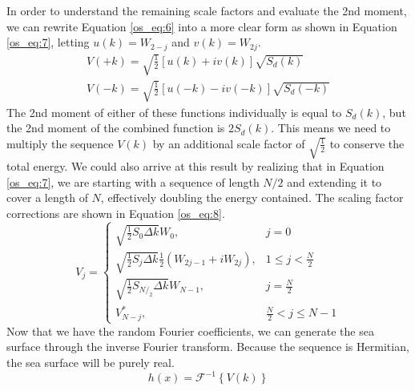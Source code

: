 In order to understand the remaining scale factors and evaluate the 2nd moment, we can rewrite Equation \ref{os_eq:6} into a more clear form as shown in Equation \ref{os_eq:7}, letting $u(k) = W_{2-j}$ and $v(k) = W_{2j}$.
\begin{equation}
  \begin{gathered}
  \label{os_eq:7}
  V(+k) = \sqrt{\frac{1}{2}}\left[u(k) + iv(k) \right]\sqrt{S_d(k)} \\
  V(-k) = \sqrt{\frac{1}{2}}\left[u(-k) - iv(-k) \right]\sqrt{S_d(-k)}
  \end{gathered}
\end{equation}
The 2nd moment of either of these functions individually is equal to $S_d(k)$, but the 2nd moment of the combined function is $2S_d(k)$. This means we need to multiply the sequence $V(k)$ by an additional scale factor of $\sqrt{\frac{1}{2}}$ to conserve the total energy. We could also arrive at this result by realizing that in Equation \ref{os_eq:7}, we are starting with a sequence of length $N/2$ and extending it to cover a length of $N$, effectively doubling the energy contained. The scaling factor corrections are shown in Equation \ref{os_eq:8}.
\begin{equation}
  \label{os_eq:8}   
  V_j = \begin{cases}
    \sqrt{\frac{1}{2}S_0\Delta k}W_0, & j = 0 \\
    \sqrt{\frac{1}{2}S_j\Delta k}\frac{1}{2}\left(W_{2j-1} + iW_{2j} \right), & 1 \leq j < \frac{N}{2} \\
    \sqrt{\frac{1}{2}S_{N/_2}\Delta k}W_{N-1}, & j = \frac{N}{2} \\
    V_{N-j}^*, &  \frac{N}{2} < j \leq N-1 
  \end{cases} 
\end{equation}
Now that we have the random Fourier coefficients, we can generate the sea surface through the inverse Fourier transform. Because the sequence is Hermitian, the sea surface will be purely real.
\begin{equation}
  \label{os_eq:9}
  h(x) = \mathcal{F}^{-1}\left\{V(k) \right\}
  \end{equation}

